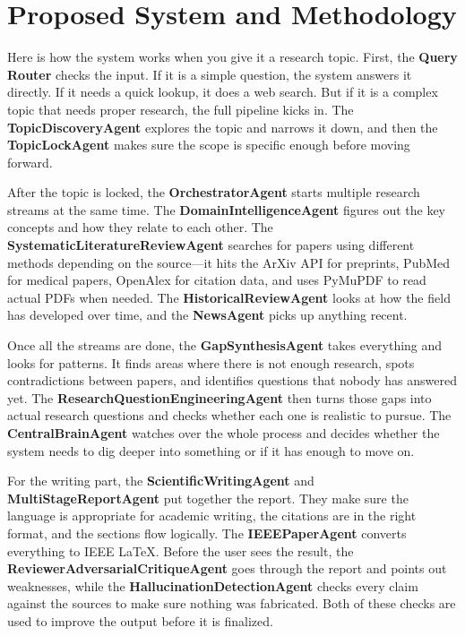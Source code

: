 \documentclass[12pt,a4paper]{article}
\begin{document}
\section{Proposed System and Methodology}

Here is how the system works when you give it a research topic. First, the \textbf{Query Router} checks the input. If it is a simple question, the system answers it directly. If it needs a quick lookup, it does a web search. But if it is a complex topic that needs proper research, the full pipeline kicks in. The \textbf{TopicDiscoveryAgent} explores the topic and narrows it down, and then the \textbf{TopicLockAgent} makes sure the scope is specific enough before moving forward.

After the topic is locked, the \textbf{OrchestratorAgent} starts multiple research streams at the same time. The \textbf{DomainIntelligenceAgent} figures out the key concepts and how they relate to each other. The \textbf{SystematicLiteratureReviewAgent} searches for papers using different methods depending on the source---it hits the ArXiv API for preprints, PubMed for medical papers, OpenAlex for citation data, and uses PyMuPDF to read actual PDFs when needed. The \textbf{HistoricalReviewAgent} looks at how the field has developed over time, and the \textbf{NewsAgent} picks up anything recent.

Once all the streams are done, the \textbf{GapSynthesisAgent} takes everything and looks for patterns. It finds areas where there is not enough research, spots contradictions between papers, and identifies questions that nobody has answered yet. The \textbf{ResearchQuestionEngineeringAgent} then turns those gaps into actual research questions and checks whether each one is realistic to pursue. The \textbf{CentralBrainAgent} watches over the whole process and decides whether the system needs to dig deeper into something or if it has enough to move on.

For the writing part, the \textbf{ScientificWritingAgent} and \textbf{MultiStageReportAgent} put together the report. They make sure the language is appropriate for academic writing, the citations are in the right format, and the sections flow logically. The \textbf{IEEEPaperAgent} converts everything to IEEE LaTeX. Before the user sees the result, the \textbf{ReviewerAdversarialCritiqueAgent} goes through the report and points out weaknesses, while the \textbf{HallucinationDetectionAgent} checks every claim against the sources to make sure nothing was fabricated. Both of these checks are used to improve the output before it is finalized.
\end{document}
